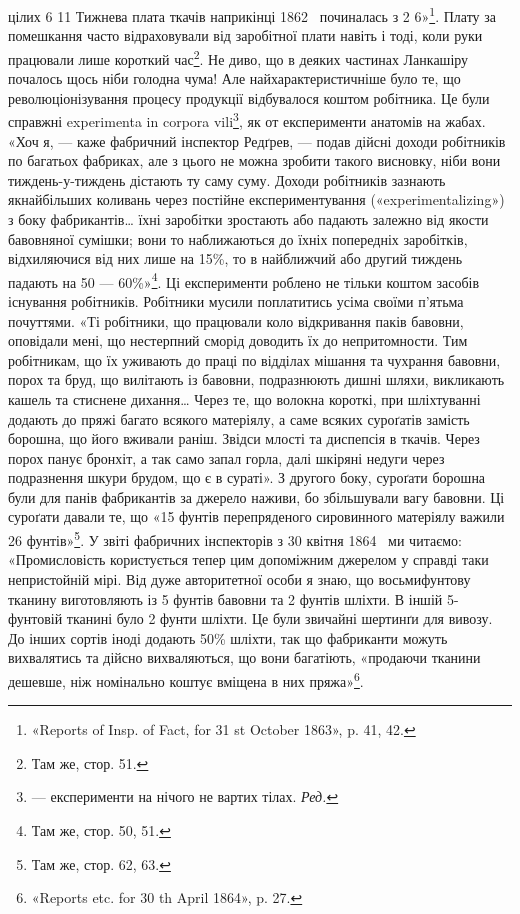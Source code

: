 \parcont{}  %
цілих 6 11 Тижнева плата ткачів наприкінці
1862~ починалась з 2 6»\footnote{
«Reports of Insp. of Fact, for 31 st October 1863», p. 41, 42.
}. Плату за помешкання
часто відраховували від заробітної плати навіть і тоді, коли
руки працювали лише короткий час\footnote{
Там же, стор. 51.
}. Не диво, що в деяких
частинах Ланкашіру почалось щось ніби голодна чума! Але найхарактеристичніше
було те, що революціонізування процесу продукції
відбувалося коштом робітника. Це були справжні experimenta
in corpora vili\footnote*{
— експерименти на нічого не вартих тілах. \emph{Ред.}
}, як от експерименти анатомів на жабах.
«Хоч я, — каже фабричний інспектор Редґрев, — подав дійсні
доходи робітників по багатьох фабриках, але з цього не можна
зробити такого висновку, ніби вони тиждень-у-тиждень дістають
ту саму суму. Доходи робітників зазнають якнайбільших
коливань через постійне експериментування («experimentalizing»)
з боку фабрикантів\dots{} їхні заробітки зростають або падають залежно
від якости бавовняної сумішки; вони то наближаються
до їхніх попередніх заробітків, відхиляючися від них лише на
15\%, то в найближчий або другий тиждень падають на 50 —
60\%»\footnote{
Там же, стор. 50, 51.
}. Ці експерименти роблено не тільки коштом засобів
існування робітників. Робітники мусили поплатитись усіма своїми
п’ятьма почуттями. «Ті робітники, що працювали коло відкривання
паків бавовни, оповідали мені, що нестерпний сморід
доводить їх до непритомности. Тим робітникам, що їх уживають
до праці по відділах мішання та чухрання бавовни, порох та бруд,
що вилітають із бавовни, подразнюють дишні шляхи, викликають
кашель та стиснене дихання\dots{} Через те, що волокна короткі,
при шліхтуванні додають до пряжі багато всякого матеріялу, а
саме всяких суроґатів замість борошна, що його вживали раніш.
Звідси млості та диспепсія в ткачів. Через порох панує бронхіт,
а так само запал горла, далі шкіряні недуги через подразнення
шкури брудом, що є в сураті». З другого боку, суроґати борошна
були для панів фабрикантів за джерело наживи, бо збільшували
вагу бавовни. Ці суроґати давали те, що «15 фунтів перепряденого
сировинного матеріялу важили 26 фунтів»\footnote{
Там же, стор. 62, 63.
}. У звіті фабричних
інспекторів з 30 квітня 1864~ ми читаємо: «Промисловість
користується тепер цим допоміжним джерелом у справді таки
непристойній мірі. Від дуже авторитетної особи я знаю, що восьмифунтову
тканину виготовляють із 5 фунтів бавовни та 2 фунтів
шліхти. В іншій 5-фунтовій тканині було 2 фунти шліхти.
Це були звичайні шертинґи для вивозу. До інших сортів іноді
додають 50\% шліхти, так що фабриканти можуть вихвалятись
та дійсно вихваляються, що вони багатіють, «продаючи тканини
дешевше, ніж номінально коштує вміщена в них пряжа»\footnote{
«Reports etc. for 30 th April 1864», p. 27.
}.
\parbreak{}  %
